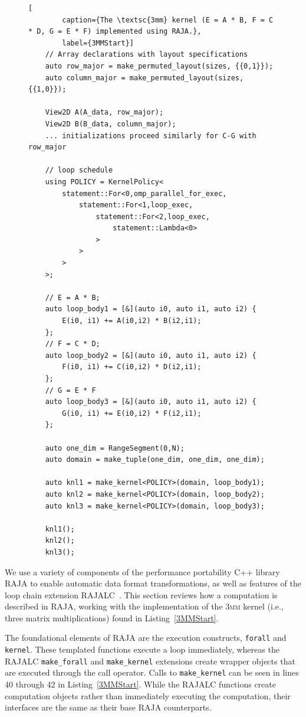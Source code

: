 \documentclass[sigconf,review=true]{acmart}
\begin{document}
\begin{figure}
	\begin{lstlisting}[
		caption={The \textsc{3mm} kernel (E = A * B, F = C * D, G = E * F) implemented using RAJA.},
		label={3MMStart}]
	// Array declarations with layout specifications
	auto row_major = make_permuted_layout(sizes, {{0,1}});
	auto column_major = make_permuted_layout(sizes, {{1,0}});

	View2D A(A_data, row_major);
	View2D B(B_data, column_major);
	... initializations proceed similarly for C-G with row_major

	// loop schedule
	using POLICY = KernelPolicy<
		statement::For<0,omp_parallel_for_exec,
			statement::For<1,loop_exec,
				statement::For<2,loop_exec,
					statement::Lambda<0>
				>
			>
		>
	>;

	// E = A * B;
	auto loop_body1 = [&](auto i0, auto i1, auto i2) {
		E(i0, i1) += A(i0,i2) * B(i2,i1);
	};
	// F = C * D;
	auto loop_body2 = [&](auto i0, auto i1, auto i2) {
		F(i0, i1) += C(i0,i2) * D(i2,i1);
	};
	// G = E * F
	auto loop_body3 = [&](auto i0, auto i1, auto i2) {
		G(i0, i1) += E(i0,i2) * F(i2,i1);
	};
	
	auto one_dim = RangeSegment(0,N);
	auto domain = make_tuple(one_dim, one_dim, one_dim);

	auto knl1 = make_kernel<POLICY>(domain, loop_body1);
	auto knl2 = make_kernel<POLICY>(domain, loop_body2);
	auto knl3 = make_kernel<POLICY>(domain, loop_body3);

	knl1();
	knl2();
	knl3();
	\end{lstlisting}
\end{figure}

\label{sec:kernelObjects}

We use a variety of components of the performance portability C++ library RAJA to enable automatic data format transformations, as well as features of the loop chain extension RAJALC~\cite{neth2021inter}. 
This section reviews how a computation is described in RAJA, working with the implementation of the \textsc{3mm} kernel (i.e., three matrix multiplications) found in Listing~\ref{3MMStart}.

The foundational elements of RAJA are the execution constructs, \verb.forall. and \verb.kernel.. 
These templated functions execute a loop immediately, whereas the RAJALC \verb.make_forall. and \verb.make_kernel. extensions create wrapper objects that are executed through the call operator. 
Calls to \verb.make_kernel. can be seen in lines 40 through 42 in Listing~\ref{3MMStart}. 
While the RAJALC functions create computation objects rather than immediately executing the computation, their interfaces are the same as their base RAJA counterparts.
\end{document}
